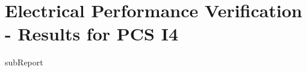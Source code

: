 \renewcommand{\DTRPcs}{I4} %
\renewcommand{\DTRPcsLong}{I4}


    \section{Electrical Performance Verification - Results for PCS \DTRPcsLong}

    {{subReport}}
    \newpage

